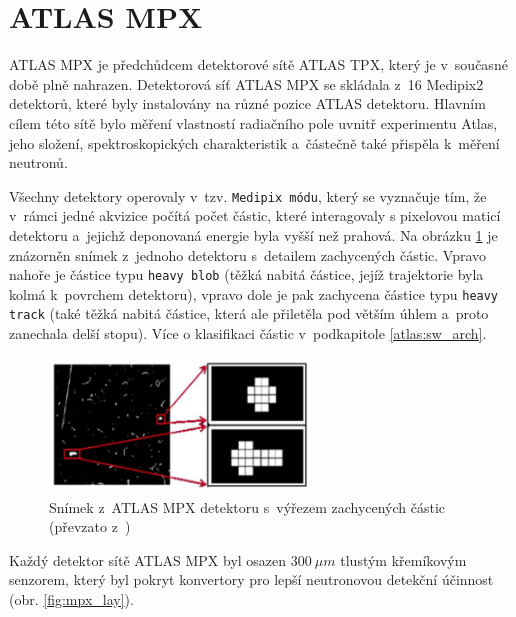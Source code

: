 \section{ATLAS MPX}\label{atlas:mpx}
ATLAS MPX\cite{Vykydal200935}\cite{atlasmpx} je předchůdcem detektorové sítě ATLAS TPX, který je v~současné době plně nahrazen. Detektorová síť ATLAS MPX se skládala z~16 Medipix2 detektorů, které byly instalovány na různé pozice ATLAS detektoru. Hlavním cílem této sítě bylo měření vlastností radiačního pole uvnitř experimentu Atlas, jeho složení, spektroskopických charakteristik a~částečně také přispěla k~měření neutronů. 

Všechny detektory operovaly v~tzv. \texttt{Medipix módu}, který se vyznačuje tím, že v~rámci jedné akvizice počítá počet částic, které interagovaly s pixelovou maticí detektoru a~jejichž deponovaná energie byla vyšší než prahová. Na obrázku \ref{fig:mpx_cluster} je znázorněn snímek z~jednoho detektoru s~detailem zachycených částic. Vpravo nahoře je částice typu \texttt{heavy blob} (těžká nabitá částice, jejíž trajektorie byla kolmá k~povrchem detektoru), vpravo dole je pak zachycena částice typu \texttt{heavy track} (také těžká nabitá částice, která ale přiletěla pod větším úhlem a~proto zanechala delší stopu). Více o klasifikaci částic v~podkapitole \ref{atlas:sw_arch}.


\begin{figure}[ht]
	\begin{center}
		\includegraphics[width=7cm]{figures/mpx_cluster.png}
		\caption{Snímek z~ATLAS MPX detektoru s~výřezem zachycených částic (převzato z~\cite{atlasmpx})}
		\label{fig:mpx_cluster}
	\end{center}
\end{figure}


Každý detektor sítě ATLAS MPX byl osazen $300~\mu m$ tlustým křemíkovým senzorem, který byl pokryt konvertory pro lepší neutronovou detekční účinnost (obr. \ref{fig:mpx_lay}).

